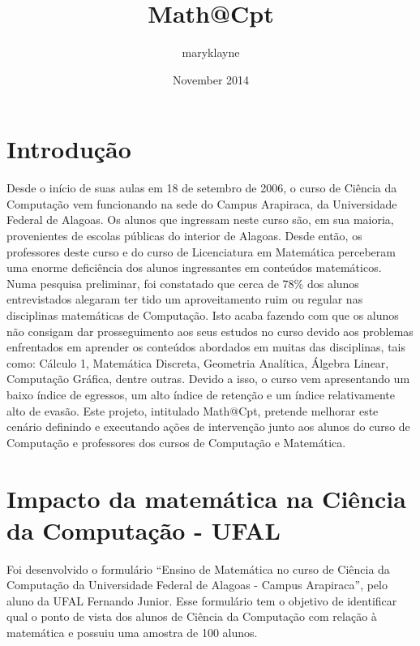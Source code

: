 \documentclass[12pt,a4paper]{article}
\title{Math@Cpt}
\author{maryklayne }
\date{November 2014}
\begin{document}
\maketitle

\section{Introdução}
Desde o início de suas aulas em 18 de setembro de 2006, o curso de Ciência da Computação vem funcionando na sede do Campus Arapiraca, da Universidade Federal de Alagoas. Os alunos que ingressam neste curso são, em sua maioria, provenientes de escolas públicas do interior de Alagoas. Desde então, os professores deste curso e do curso de Licenciatura em Matemática perceberam uma enorme deficiência dos alunos ingressantes em conteúdos matemáticos. Numa pesquisa preliminar, foi constatado que cerca de 78\% dos alunos entrevistados alegaram ter tido um  aproveitamento ruim ou regular nas disciplinas matemáticas de Computação. Isto acaba fazendo com que os alunos não consigam dar prosseguimento aos seus estudos no curso devido aos problemas enfrentados em aprender os conteúdos abordados em muitas das disciplinas, tais como: Cálculo 1, Matemática Discreta, Geometria Analítica, Álgebra Linear, Computação Gráfica, dentre outras. Devido a isso, o curso vem apresentando um baixo índice de egressos, um alto índice de retenção e um índice relativamente alto de evasão. Este projeto, intitulado Math@Cpt, pretende melhorar este cenário definindo e executando ações de intervenção junto aos alunos do curso de Computação e professores dos cursos de Computação e Matemática.

\section{Impacto da matemática na Ciência da Computação - UFAL}

Foi desenvolvido o formulário “Ensino de Matemática no curso de Ciência da Computação da Universidade Federal de Alagoas - Campus Arapiraca”, pelo aluno da UFAL Fernando Junior. Esse formulário tem o objetivo de identificar qual o ponto de vista dos alunos de Ciência da Computação com relação à matemática e possuiu uma amostra de 100 alunos. 
\end{document}
